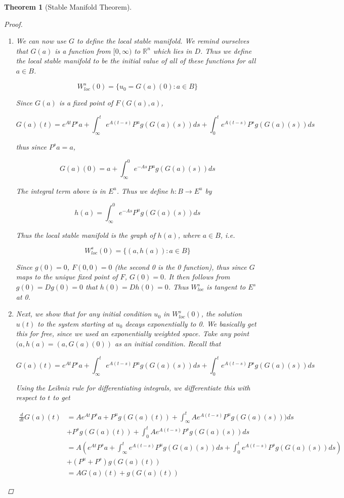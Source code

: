 \documentclass{article}
\newtheorem{theorem}{Theorem}[section]
\def\R{{\mathbb R}}
\begin{document}
\begin{theorem}[Stable Manifold Theorem]
\begin{proof}
\begin{enumerate}
\item We can now use $G$ to define the local stable manifold. We remind ourselves that $G(a)$ is a function from $[0, \infty)$ to $\R^n$ which lies in $D$. Thus we define the local stable manifold to be the initial value of all of these functions for all $a \in B$.

\[
W^s_{loc}(0) = \{ u_0 = G(a)(0) : a \in B \}
\] 

Since $G(a)$ is a fixed point of $F(G(a), a)$,

\[
G(a)(t) = e^{At} P^s a + \int_\infty^t e^{A(t-s)} P^u g(G(a)(s)) ds + \int_0^t e^{A(t-s)} P^s g(G(a)(s)) ds
\]

thus since $P^s a = a$,

\[
G(a)(0) = a + \int_\infty^0 e^{-As} P^u g(G(a)(s)) ds
\]

The integral term above is in $E^u$. Thus we define $h: B \rightarrow E^u$ by

\[
h(a) = \int_\infty^0 e^{-As} P^u g(G(a)(s)) ds
\]

Thus the local stable manifold is the graph of $h(a)$, where $a \in B$, i.e.

\[
W^s_{loc}(0) = \{ (a, h(a)) : a \in B \}
\]

Since $g(0) = 0$, $F(0, 0) = 0$ (the second 0 is the 0 function), thus since $G$ maps to the unique fixed point of $F$, $G(0) = 0$. It then follows from $g(0) = Dg(0) = 0$ that $h(0) = Dh(0) = 0$. Thus $W^s_{loc}$ is tangent to $E^s$ at 0.

\item Next, we show that for any initial condition $u_0$ in $W^s_{loc}(0)$, the solution $u(t)$ to the system starting at $u_0$ decays exponentially to 0. We basically get this for free, since we used an exponentially weighted space. Take any point $(a, h(a) = (a, G(a)(0))$ as an initial condition. Recall that

\[
G(a)(t) = e^{At} P^s a + \int_\infty^t e^{A(t-s)} P^u g(G(a)(s)) ds + \int_0^t e^{A(t-s)} P^s g(G(a)(s)) ds
\]

Using the Leibniz rule for differentiating integrals, we differentiate this with respect to $t$ to get 

\begin{align*}
\frac{d}{dt}G(a)(t) &= A e^{At} P^s a + P^u g(G(a)(t)) + \int_\infty^t A e^{A(t-s)} P^u g(G(a)(s))) ds \\
&+ P^s g(G(a)(t))
+ \int_0^t A e^{A(t-s)} P^s g(G(a)(s)) ds \\
&= A\left(e^{At} P^s a + \int_\infty^t e^{A(t-s)} P^u g(G(a)(s)) ds + \int_0^t e^{A(t-s)} P^s g(G(a)(s)) ds \right) \\
&+ (P^u + P^s)g(G(a)(t)) \\
&= A G(a)(t) + g(G(a)(t))
\end{align*}


\end{enumerate}
\end{proof}
\end{theorem}
\end{document}

